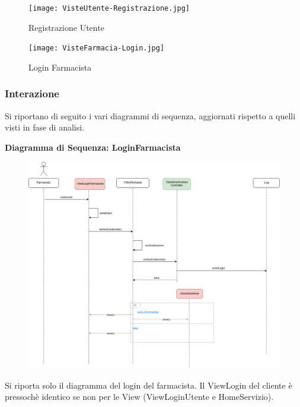 \begin{figure}[h!]
    \centering
    \texttt{[image: VisteUtente-Registrazione.jpg]}
    \caption{Registrazione Utente}
\end{figure}
\newpage

\begin{figure}[h!]
    \centering
    \texttt{[image: VisteFarmacia-Login.jpg]}
    \caption{Login Farmacista}
\end{figure}
\newpage

\subsubsection{Interazione}

Si riportano di seguito i vari diagrammi di sequenza, aggiornati rispetto a quelli visti in fase di analisi.

\vspace{3em}

\textbf{Diagramma di Sequenza: LoginFarmacista}

\begin{figure}[h!]
    \begin{center}
        \includegraphics[width=\textwidth]{immagini/Interazione-LoginUtente-progettaz.jpg}
    \end{center}
\end{figure}

Si riporta solo il diagramma del login del farmacista. Il ViewLogin del cliente è
pressochè identico se non per le View (ViewLoginUtente e HomeServizio).

